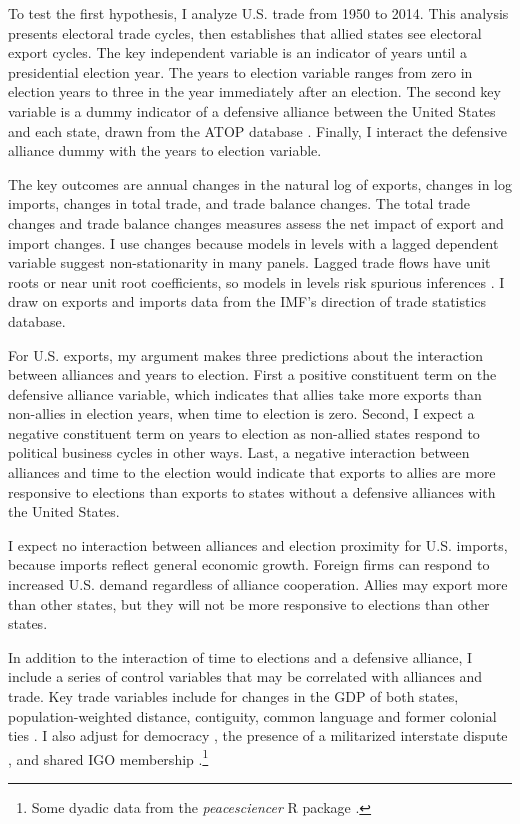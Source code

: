 \documentclass[12pt]{article}
\begin{document}
To test the first hypothesis, I analyze U.S. trade from 1950 to 2014. 
This analysis presents electoral trade cycles, then establishes that allied states see electoral export cycles.
The key independent variable is an indicator of years until a presidential election year.
The years to election variable ranges from zero in election years to three in the year immediately after an election. 
The second key variable is a dummy indicator of a defensive alliance between the United States and each state, drawn from the ATOP database \citep{Leedsetal2002}.
Finally, I interact the defensive alliance dummy with the years to election variable.


The key outcomes are annual changes in the natural log of exports, changes in log imports, changes in total trade, and trade balance changes.
The total trade changes and trade balance changes measures assess the net impact of export and import changes.
I use changes because models in levels with a lagged dependent variable suggest non-stationarity in many panels. 
Lagged trade flows have unit roots or near unit root coefficients, so models in levels risk spurious inferences \citep{GrangerNewbold1974}.
I draw on exports and imports data from the IMF's direction of trade statistics database.


For U.S. exports, my argument makes three predictions about the interaction between alliances and years to election. 
First a positive constituent term on the defensive alliance variable, which indicates that allies take more exports than non-allies in election years, when time to election is zero.
Second, I expect a negative constituent term on years to election as non-allied states respond to political business cycles in other ways.
Last, a negative interaction between alliances and time to the election would indicate that exports to allies are more responsive to elections than exports to states without a defensive alliances with the United States.


I expect no interaction between alliances and election proximity for U.S. imports, because imports reflect general economic growth.
Foreign firms can respond to increased U.S. demand regardless of alliance cooperation.  
Allies may export more than other states, but they will not be more responsive to elections than other states.


In addition to the interaction of time to elections and a defensive alliance, I include a series of control variables that may be correlated with alliances and trade. 
Key trade variables include for changes in the GDP of both states, population-weighted distance, contiguity, common language and former colonial ties \citep{FouquinHugot2016}.
I also adjust for democracy \citep{Marquez2016}, the presence of a militarized interstate dispute \citep{Gibleretal2016}, and shared IGO membership \citep{Pevehouseetal2020}.\footnote{Some dyadic data from the \textit{peacesciencer} \textsf{R} package \citep{peacesciencer-package}.}
\end{document}
